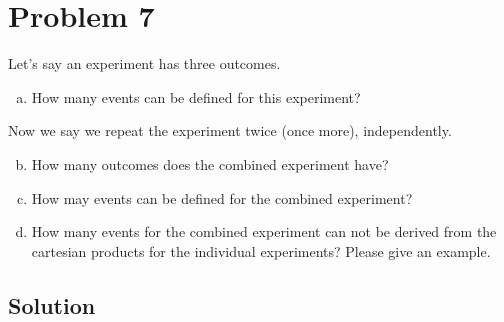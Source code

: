 \section{Problem 7}
Let's say an experiment has three outcomes.

\begin{enumerate}[a.]
	\item How many events can be defined for this experiment?
\end{enumerate}

	
Now we say we repeat the experiment twice (once more), independently.

\begin{enumerate}[a.]\setcounter{enumi}{1}
	\item How many outcomes does the combined experiment have?
	\item How may events can be defined for the combined experiment?
	\item How many events for the combined experiment can not be derived from the cartesian products for the individual experiments? Please give an example.
\end{enumerate}

\subsection{Solution}

